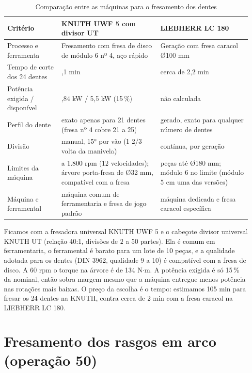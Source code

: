 \begin{table}[H]
\centering
\caption{Comparação entre as máquinas para o fresamento dos dentes}\label{tab:cmp-dentes}
{\small\renewcommand{\arraystretch}{1.2}
\begin{tabular}{|>{\raggedright\arraybackslash}p{3.4cm}|>{\raggedright\arraybackslash}p{5.3cm}|>{\raggedright\arraybackslash}p{5.3cm}|}
\hline
\rowcolor{cinza} \textbf{Critério} & \textbf{KNUTH UWF 5 com divisor UT} & \textbf{LIEBHERR LC 180} \\ \hline
Processo e ferramenta & Fresamento com fresa de disco de módulo 6 nº 4, aço rápido & Geração com fresa caracol Ø100 mm \\ \hline
Tempo de corte dos 24 dentes & 105,1 min & cerca de 2,2 min \\ \hline
Potência exigida / disponível & 0,84 kW / 5,5 kW (15\,\%) & não calculada \\ \hline
Perfil do dente & exato apenas para 21 dentes (fresa nº 4 cobre 21 a 25) & gerado, exato para qualquer número de dentes \\ \hline
Divisão & manual, 15° por vão (1 2/3 volta da manivela) & contínua, por geração \\ \hline
Limites da máquina & 60 a 1.800 rpm (12 velocidades); árvore porta-fresa de Ø32 mm, compatível com a fresa & peças até Ø180 mm; módulo 6 no limite (módulo 5 em uma das versões) \\ \hline
Máquina e ferramental & máquina comum de ferramentaria e fresa de jogo padrão & máquina dedicada e fresa caracol específica \\ \hline
\end{tabular}}
\end{table}

Ficamos com a fresadora universal KNUTH UWF 5 e o cabeçote divisor universal KNUTH UT (relação 40:1, divisões de 2 a 50 partes). Ela é comum em ferramentaria, o ferramental é barato para um lote de 10 peças, e a qualidade adotada para os dentes (DIN 3962, qualidade 9 a 10) é compatível com a fresa de disco. A 60 rpm o torque na árvore é de 134 N$\cdot$m. A potência exigida é só 15\,\% da nominal, então sobra margem mesmo que a máquina entregue menos potência nas rotações mais baixas. O preço da escolha é o tempo: estimamos 105 min para fresar os 24 dentes na KNUTH, contra cerca de 2 min com a fresa caracol na LIEBHERR LC 180.

\section{Fresamento dos rasgos em arco (operação 50)}

